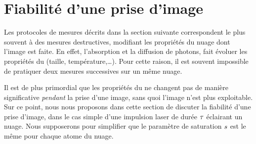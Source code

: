 \casse

\section{Fiabilité d'une prise d'image}\label{sec:precautions}

Les protocoles de mesures décrits dans la section suivante correspondent le plus souvent à des mesures destructives, \cad modifiant les propriétés du nuage dont l'image est faite. En effet, l'absorption et la diffusion de photons, fait évoluer les propriétés du \nat (taille, température,\ldots).
Pour cette raison, il est souvent impossible de pratiquer deux mesures successives sur un même nuage. 

Il est de plus primordial que les propriétés du \nat ne changent pas de manière significative \emph{pendant} la prise d'une image, sans quoi l'image n'est plus exploitable. Sur ce point, nous nous proposons dans cette section de discuter la fiabilité d'une prise d'image, dans le cas simple d'une impulsion laser de durée ${\tau}$ éclairant un nuage. Nous supposerons pour simplifier que le paramètre de saturation ${s}$ est le même pour chaque atome du nuage.


